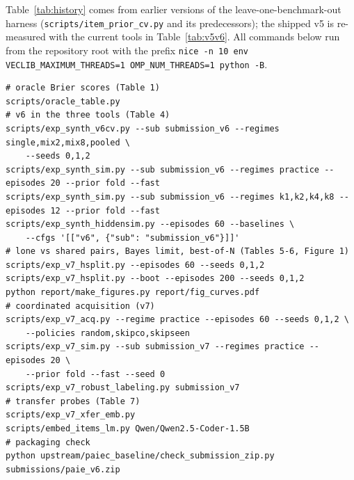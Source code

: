 \documentclass{article}
\begin{document}
{\raggedright Table~\ref{tab:history} comes from earlier versions of the leave-one-benchmark-out harness (\texttt{scripts/item\_prior\_cv.py} and
its predecessors); the shipped v5 is re-measured with the current tools in Table~\ref{tab:v5v6}. All commands below run from the
repository root with the prefix
\texttt{nice -n 10 env VECLIB\_MAXIMUM\_THREADS=1 OMP\_NUM\_THREADS=1 python -B}.\par}
\begin{scriptsize}
\begin{verbatim}
# oracle Brier scores (Table 1)
scripts/oracle_table.py
# v6 in the three tools (Table 4)
scripts/exp_synth_v6cv.py --sub submission_v6 --regimes single,mix2,mix8,pooled \
    --seeds 0,1,2
scripts/exp_synth_sim.py --sub submission_v6 --regimes practice --episodes 20 --prior fold --fast
scripts/exp_synth_sim.py --sub submission_v6 --regimes k1,k2,k4,k8 --episodes 12 --prior fold --fast
scripts/exp_synth_hiddensim.py --episodes 60 --baselines \
    --cfgs '[["v6", {"sub": "submission_v6"}]]'
# lone vs shared pairs, Bayes limit, best-of-N (Tables 5-6, Figure 1)
scripts/exp_v7_hsplit.py --episodes 60 --seeds 0,1,2
scripts/exp_v7_hsplit.py --boot --episodes 200 --seeds 0,1,2
python report/make_figures.py report/fig_curves.pdf
# coordinated acquisition (v7)
scripts/exp_v7_acq.py --regime practice --episodes 60 --seeds 0,1,2 \
    --policies random,skipco,skipseen
scripts/exp_v7_sim.py --sub submission_v7 --regimes practice --episodes 20 \
    --prior fold --fast --seed 0
scripts/exp_v7_robust_labeling.py submission_v7
# transfer probes (Table 7)
scripts/exp_v7_xfer_emb.py
scripts/embed_items_lm.py Qwen/Qwen2.5-Coder-1.5B
# packaging check
python upstream/paiec_baseline/check_submission_zip.py submissions/paie_v6.zip
\end{verbatim}
\end{scriptsize}
\end{document}
